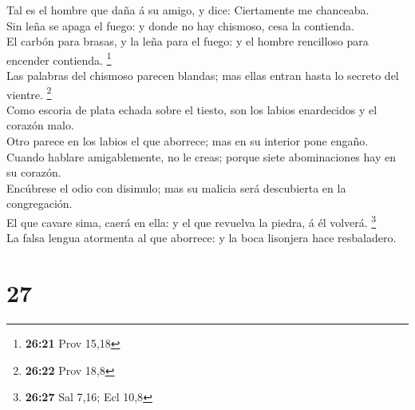  Tal es el hombre que daña á su amigo, y dice: Ciertamente
me chanceaba.\\
 Sin leña se apaga el fuego: y donde no hay chismoso, cesa
la contienda.\\
 El carbón para brasas, y la leña para el fuego: y el
hombre rencilloso para encender contienda. \footnote{\textbf{26:21} Prov
  15,18}\\
 Las palabras del chismoso parecen blandas; mas ellas
entran hasta lo secreto del vientre. \footnote{\textbf{26:22} Prov 18,8}\\
 Como escoria de plata echada sobre el tiesto, son los
labios enardecidos y el corazón malo.\\
 Otro parece en los labios el que aborrece; mas en su
interior pone engaño.\\
 Cuando hablare amigablemente, no le creas; porque siete
abominaciones hay en su corazón.\\
 Encúbrese el odio con disimulo; mas su malicia será
descubierta en la congregación.\\
 El que cavare sima, caerá en ella: y el que revuelva la
piedra, á él volverá. \footnote{\textbf{26:27} Sal 7,16; Ecl 10,8}\\
 La falsa lengua atormenta al que aborrece: y la boca
lisonjera hace resbaladero.

\hypertarget{section-26}{%
\section{27}\label{section-26}}

